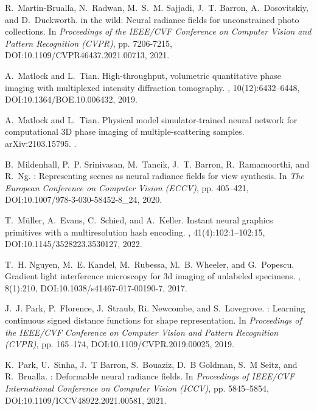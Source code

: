 \documentclass[11pt]{article}
\theoremstyle{plain} %
\begin{document}
\begin{thebibliography}{10}
R.~Martin-Brualla, N.~Radwan, M.~S.~M. Sajjadi, J.~T. Barron, A.~Dosovitskiy, and D.~Duckworth.
 in the wild: {N}eural radiance fields for unconstrained photo collections.
\newblock In {\em Proceedings of the IEEE/CVF Conference on Computer Vision and Pattern Recognition (CVPR)}, pp. 7206-7215,
\newblock DOI:10.1109/CVPR46437.2021.00713,
2021.

A.~Matlock and L.~Tian.
\newblock High-throughput, volumetric quantitative phase imaging with multiplexed intensity diffraction tomography.
, 10(12):6432--6448,
\newblock DOI:10.1364/BOE.10.006432,
2019.

A.~Matlock and L.~Tian.
\newblock Physical model simulator-trained neural network for computational 3{D} phase imaging of multiple-scattering samples. 
\newblock arXiv:2103.15795.
.

B.~Mildenhall, P.~P. Srinivasan, M.~Tancik, J.~T. Barron, R.~Ramamoorthi, and R.~Ng.
: Representing scenes as neural radiance fields for view synthesis.
\newblock In {\em The European Conference on Computer Vision (ECCV)}, pp. 405--421,
\newblock DOI:10.1007/978-3-030-58452-8\_24,
2020.

T.~M\"uller, A.~Evans, C.~Schied, and A.~Keller.
\newblock Instant neural graphics primitives with a multiresolution hash encoding.
, 41(4):102:1--102:15,
\newblock DOI:10.1145/3528223.3530127,
2022.

T.~H. Nguyen, M.~E. Kandel, M.~Rubessa, M.~B. Wheeler, and G.~Popescu.
\newblock Gradient light interference microscopy for 3d imaging of unlabeled specimens.
, 8(1):210,
\newblock DOI:10.1038/s41467-017-00190-7,
2017.

J.~J. Park, P.~Florence, J.~Straub, Ri. Newcombe, and S.~Lovegrove.
: Learning continuous signed distance functions for shape representation.
\newblock In {\em Proceedings of the IEEE/CVF Conference on Computer Vision and Pattern Recognition (CVPR)}, pp. 165--174,
\newblock DOI:10.1109/CVPR.2019.00025,
2019.

K.~Park, U.~Sinha, J.~T Barron, S.~Bouaziz, D.~B Goldman, S.~M Seitz, and R.~Brualla.
: Deformable neural radiance fields.
\newblock In {\em Proceedings of IEEE/CVF International Conference on Computer Vision (ICCV)}, pp. 5845--5854,
\newblock DOI:10.1109/ICCV48922.2021.00581,
2021.


\end{thebibliography}
\end{document}
